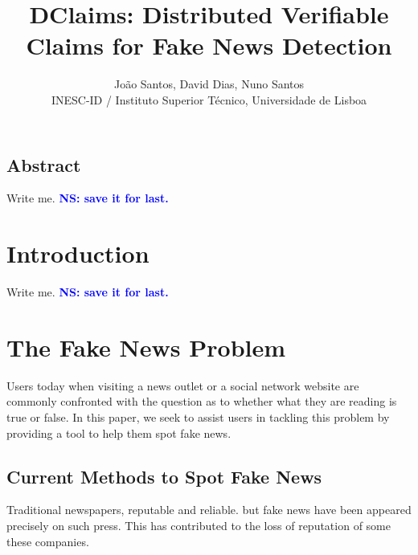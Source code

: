 \documentclass[letterpaper,twocolumn,10pt]{article}
\newcommand{\note}[1]{\textcolor{blue}{\bf #1}}
\begin{document}
\date{}

\title{\Large \bf DClaims: Distributed Verifiable Claims for Fake News Detection}

\author{
{\rm João Santos, David Dias, Nuno Santos}\\
INESC-ID / Instituto Superior T\'{e}cnico, Universidade de Lisboa
} %

\maketitle

\thispagestyle{empty}


\subsection*{Abstract}
Write me. \note{NS: save it for last.}

\section{Introduction}

Write me. \note{NS: save it for last.}

\clearpage

\section{The Fake News Problem}

Users today when visiting a news outlet or a social network website are commonly confronted with the question as to whether what they are reading is true or false. In this paper, we seek to assist users in tackling this problem by providing a tool to help them spot fake news.

\subsection{Current Methods to Spot Fake News}

Traditional newspapers, reputable and reliable. but fake news have been appeared precisely on such press. This has contributed to the loss of reputation of some these companies.
\end{document}
